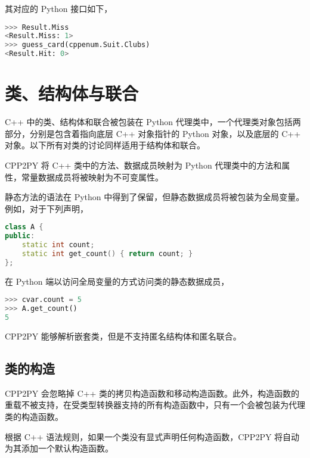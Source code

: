 其对应的 Python 接口如下，

\begin{framed}
\begin{lstlisting}[language=python]
>>> Result.Miss
<Result.Miss: 1>
>>> guess_card(cppenum.Suit.Clubs)
<Result.Hit: 0>
\end{lstlisting}
\end{framed}

\section{类、结构体与联合}

C++ 中的类、结构体和联合被包装在 Python 代理类中，一个代理类对象包括两部分，分别是包含着指向底层 C++ 对象指针的 Python 对象，以及底层的 C++ 对象。以下所有对类的讨论同样适用于结构体和联合。

CPP2PY 将 C++ 类中的方法、数据成员映射为 Python 代理类中的方法和属性，常量数据成员将被映射为不可变属性。

静态方法的语法在 Python 中得到了保留，但静态数据成员将被包装为全局变量。例如，对于下列声明，

\begin{framed}
\begin{lstlisting}[language=c++]
class A {
public:
    static int count;
    static int get_count() { return count; }
};
\end{lstlisting}
\end{framed}

在 Python 端以访问全局变量的方式访问类的静态数据成员，

\begin{framed}
\begin{lstlisting}[language=python]
>>> cvar.count = 5
>>> A.get_count()
5
\end{lstlisting}
\end{framed}

CPP2PY 能够解析嵌套类，但是不支持匿名结构体和匿名联合。

\subsection{类的构造}

CPP2PY 会忽略掉 C++ 类的拷贝构造函数和移动构造函数。此外，构造函数的重载不被支持，在受类型转换器支持的所有构造函数中，只有一个会被包装为代理类的构造函数。

根据 C++ 语法规则，如果一个类没有显式声明任何构造函数，CPP2PY 将自动为其添加一个默认构造函数。

